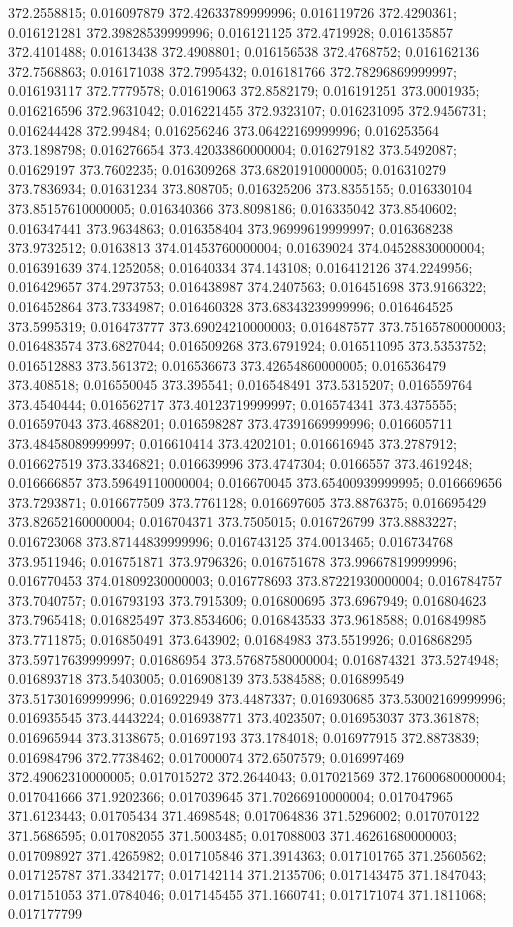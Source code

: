 372.2558815; 0.016097879 372.42633789999996; 0.016119726 372.4290361; 0.016121281 372.39828539999996; 0.016121125 372.4719928; 0.016135857 372.4101488; 0.01613438 372.4908801; 0.016156538 372.4768752; 0.016162136 372.7568863; 0.016171038 372.7995432; 0.016181766 372.78296869999997; 0.016193117 372.7779578; 0.01619063 372.8582179; 0.016191251 373.0001935; 0.016216596 372.9631042; 0.016221455 372.9323107; 0.016231095 372.9456731; 0.016244428 372.99484; 0.016256246 373.06422169999996; 0.016253564 373.1898798; 0.016276654 373.42033860000004; 0.016279182 373.5492087; 0.01629197 373.7602235; 0.016309268 373.68201910000005; 0.016310279 373.7836934; 0.01631234 373.808705; 0.016325206 373.8355155; 0.016330104 373.85157610000005; 0.016340366 373.8098186; 0.016335042 373.8540602; 0.016347441 373.9634863; 0.016358404 373.96999619999997; 0.016368238 373.9732512; 0.0163813 374.01453760000004; 0.01639024 374.04528830000004; 0.016391639 374.1252058; 0.01640334 374.143108; 0.016412126 374.2249956; 0.016429657 374.2973753; 0.016438987 374.2407563; 0.016451698 373.9166322; 0.016452864 373.7334987; 0.016460328 373.68343239999996; 0.016464525 373.5995319; 0.016473777 373.69024210000003; 0.016487577 373.75165780000003; 0.016483574 373.6827044; 0.016509268 373.6791924; 0.016511095 373.5353752; 0.016512883 373.561372; 0.016536673 373.42654860000005; 0.016536479 373.408518; 0.016550045 373.395541; 0.016548491 373.5315207; 0.016559764 373.4540444; 0.016562717 373.40123719999997; 0.016574341 373.4375555; 0.016597043 373.4688201; 0.016598287 373.47391669999996; 0.016605711 373.48458089999997; 0.016610414 373.4202101; 0.016616945 373.2787912; 0.016627519 373.3346821; 0.016639996 373.4747304; 0.0166557 373.4619248; 0.016666857 373.59649110000004; 0.016670045 373.65400939999995; 0.016669656 373.7293871; 0.016677509 373.7761128; 0.016697605 373.8876375; 0.016695429 373.82652160000004; 0.016704371 373.7505015; 0.016726799 373.8883227; 0.016723068 373.87144839999996; 0.016743125 374.0013465; 0.016734768 373.9511946; 0.016751871 373.9796326; 0.016751678 373.99667819999996; 0.016770453 374.01809230000003; 0.016778693 373.87221930000004; 0.016784757 373.7040757; 0.016793193 373.7915309; 0.016800695 373.6967949; 0.016804623 373.7965418; 0.016825497 373.8534606; 0.016843533 373.9618588; 0.016849985 373.7711875; 0.016850491 373.643902; 0.01684983 373.5519926; 0.016868295 373.59717639999997; 0.01686954 373.57687580000004; 0.016874321 373.5274948; 0.016893718 373.5403005; 0.016908139 373.5384588; 0.016899549 373.51730169999996; 0.016922949 373.4487337; 0.016930685 373.53002169999996; 0.016935545 373.4443224; 0.016938771 373.4023507; 0.016953037 373.361878; 0.016965944 373.3138675; 0.01697193 373.1784018; 0.016977915 372.8873839; 0.016984796 372.7738462; 0.017000074 372.6507579; 0.016997469 372.49062310000005; 0.017015272 372.2644043; 0.017021569 372.17600680000004; 0.017041666 371.9202366; 0.017039645 371.70266910000004; 0.017047965 371.6123443; 0.01705434 371.4698548; 0.017064836 371.5296002; 0.017070122 371.5686595; 0.017082055 371.5003485; 0.017088003 371.46261680000003; 0.017098927 371.4265982; 0.017105846 371.3914363; 0.017101765 371.2560562; 0.017125787 371.3342177; 0.017142114 371.2135706; 0.017143475 371.1847043; 0.017151053 371.0784046; 0.017145455 371.1660741; 0.017171074 371.1811068; 0.017177799 